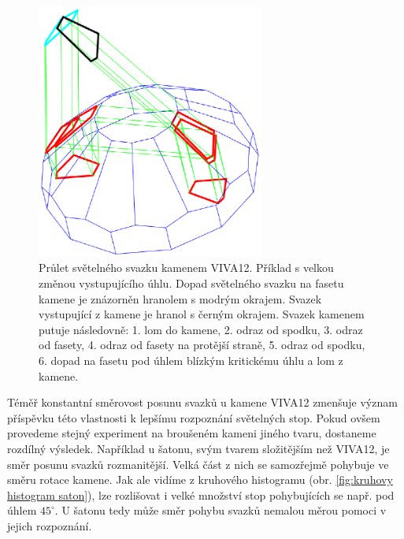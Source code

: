 \newpage
\begin{figure}[h!]
\begin{center}
\includegraphics[width = 7.5cm]{figures/odraz.eps}
\end{center}
\caption{Průlet světelného svazku kamenem VIVA12. Příklad s velkou změnou vystupujícího úhlu. Dopad světelného svazku na fasetu kamene je znázorněn hranolem s modrým okrajem. Svazek vystupující z kamene je hranol s černým okrajem. Svazek kamenem putuje následovně: 1. lom do kamene, 2. odraz od spodku, 3. odraz od fasety, 4. odraz od fasety na protější straně, 5. odraz od spodku, 6. dopad na fasetu pod úhlem blízkým kritickému úhlu a lom z kamene.}

\label{fig:odrazy v kamenu}
\end{figure}
\newpage

Téměř konstantní směrovost posunu svazků u kamene VIVA12 zmenšuje význam příspěvku této vlastnosti k lepšímu rozpoznání světelných stop. Pokud ovšem provedeme stejný experiment na broušeném kameni jiného tvaru, dostaneme rozdílný výsledek. Například u šatonu, svým tvarem složitějším než VIVA12, je směr posunu svazků rozmanitější. Velká část z nich se samozřejmě pohybuje ve směru rotace kamene. Jak ale vidíme z kruhového histogramu (obr. \ref{fig:kruhovy histogram saton}), lze rozlišovat i velké množství stop pohybujících se např. pod úhlem $45^\circ$. U šatonu tedy může směr pohybu svazků nemalou měrou pomoci v jejich rozpoznání. 

